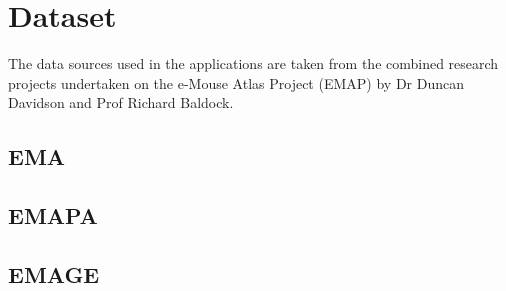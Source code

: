 \chapter{Dataset}
The data sources used in the applications are taken from the combined research projects undertaken on the e-Mouse Atlas Project (EMAP) by Dr Duncan Davidson and Prof Richard Baldock. 
\section{EMA}
\section{EMAPA}
\section{EMAGE}